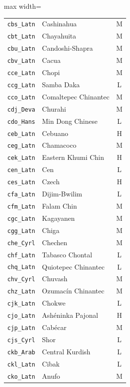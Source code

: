 {\begin{adjustbox}{max width=\textwidth}
\begin{tabular}{llc}
        \texttt{cbs\_Latn} & Cashinahua & M \\
        \texttt{cbt\_Latn} & Chayahuita & M \\
        \texttt{cbu\_Latn} & Candoshi-Shapra & M \\
        \texttt{cbv\_Latn} & Cacua & M \\
        \texttt{cce\_Latn} & Chopi & M \\
        \texttt{ccg\_Latn} & Samba Daka & L \\
        \texttt{cco\_Latn} & Comaltepec Chinantec & M \\
        \texttt{cdj\_Deva} & Churahi & M \\
        \texttt{cdo\_Hans} & Min Dong Chinese & L \\
        \texttt{ceb\_Latn} & Cebuano & H \\
        \texttt{ceg\_Latn} & Chamacoco & M \\
        \texttt{cek\_Latn} & Eastern Khumi Chin & H \\
        \texttt{cen\_Latn} & Cen & L \\
        \texttt{ces\_Latn} & Czech & H \\
        \texttt{cfa\_Latn} & Dijim-Bwilim & L \\
        \texttt{cfm\_Latn} & Falam Chin & M \\
        \texttt{cgc\_Latn} & Kagayanen & M \\
        \texttt{cgg\_Latn} & Chiga & M \\
        \texttt{che\_Cyrl} & Chechen & M \\
        \texttt{chf\_Latn} & Tabasco Chontal & L \\
        \texttt{chq\_Latn} & Quiotepec Chinantec & L \\
        \texttt{chv\_Cyrl} & Chuvash & M \\
        \texttt{chz\_Latn} & Ozumacín Chinantec & M \\
        \texttt{cjk\_Latn} & Chokwe & L \\
        \texttt{cjo\_Latn} & Ashéninka Pajonal & H \\
        \texttt{cjp\_Latn} & Cabécar & M \\
        \texttt{cjs\_Cyrl} & Shor & L \\
        \texttt{ckb\_Arab} & Central Kurdish & L \\
        \texttt{ckl\_Latn} & Cibak & L \\
        \texttt{cko\_Latn} & Anufo & M \\

\end{tabular}
\end{adjustbox}}
